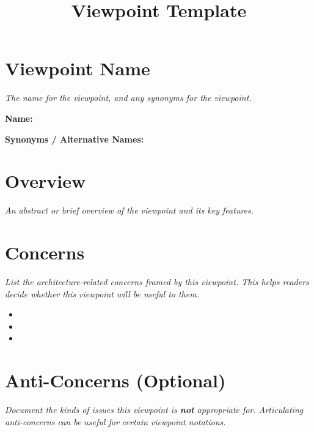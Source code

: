\documentclass[11pt]{article}
\begin{document}
\title{Viewpoint Template}
\author{}
\date{}
\maketitle

\section*{Viewpoint Name}
\textit{The name for the viewpoint, and any synonyms for the viewpoint.}

\vspace{1em}
\noindent
\textbf{Name:} \hrulefill

\vspace{0.5em}
\noindent
\textbf{Synonyms / Alternative Names:}

\vspace{4em}

\section*{Overview}
\textit{An abstract or brief overview of the viewpoint and its key features.}

\vspace{6em}

\section*{Concerns}
\textit{List the architecture-related concerns framed by this viewpoint. This
helps readers decide whether this viewpoint will be useful to them.}

\vspace{0.5em}
\begin{itemize}[nosep]
  \item
  \item
  \item
\end{itemize}

\vspace{2em}

\section*{Anti-Concerns (Optional)}
\textit{Document the kinds of issues this viewpoint is \textbf{not} appropriate
for. Articulating anti-concerns can be useful for certain viewpoint notations.}
\end{document}
